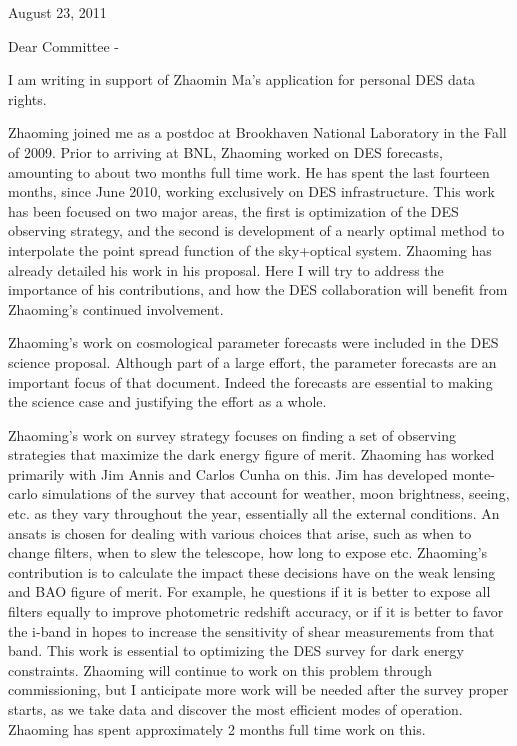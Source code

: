 \documentclass[12pt]{letter}
\begin{document}
\hfill August 23,  2011
\newline

Dear Committee -

I am writing in support of Zhaomin Ma's application for personal DES data
rights.  

Zhaoming joined me as a postdoc at Brookhaven National Laboratory in the Fall
of 2009.  Prior to arriving at BNL, Zhaoming worked on DES forecasts, amounting
to about two months full time work.  He has spent the last fourteen months,
since June 2010, working exclusively on DES infrastructure.  This work has been
focused on two major areas, the first is optimization of the DES observing
strategy, and the second is development of a nearly optimal method to
interpolate the point spread function of the sky+optical system.  Zhaoming has
already detailed his work in his proposal.  Here I will try to address the
importance of his contributions, and how the DES collaboration will benefit
from Zhaoming's continued involvement.

Zhaoming's work on cosmological parameter forecasts were included in the DES
science proposal.  Although part of a large effort, the parameter forecasts are
an important focus of that document.  Indeed the forecasts are essential to
making the science case and justifying the effort as a whole.

Zhaoming's work on survey strategy focuses on finding a set of observing
strategies that maximize the dark energy figure of merit.  Zhaoming has worked
primarily with Jim Annis and Carlos Cunha on this.  Jim has developed
monte-carlo simulations of the survey that account for weather, moon
brightness, seeing, etc. as they vary throughout the year, essentially all the
external conditions.  An ansats is chosen for dealing with various choices that
arise, such as when to change filters, when to slew the telescope, how long to
expose etc.  Zhaoming's contribution is to calculate the impact these decisions
have on the weak lensing and BAO figure of merit.  For example, he questions if
it is better to expose all filters equally to improve photometric redshift
accuracy, or if it is better to favor the i-band in hopes to increase the
sensitivity of shear measurements from that band.   This work is essential to
optimizing the DES survey for dark energy constraints.  Zhaoming will continue
to work on this problem through commissioning, but I anticipate more work will
be needed after the survey proper starts, as we take data and discover the most
efficient modes of operation.  Zhaoming has spent approximately 2 months full
time work on this.
\end{document}
